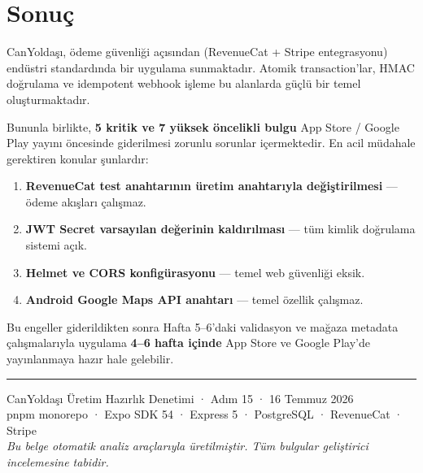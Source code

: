 \documentclass[12pt,a4paper]{article}
\begin{document}
\section{Sonuç}

CanYoldaşı, ödeme güvenliği açısından (RevenueCat + Stripe entegrasyonu) endüstri standardında bir uygulama sunmaktadır. Atomik transaction'lar, HMAC doğrulama ve idempotent webhook işleme bu alanlarda güçlü bir temel oluşturmaktadır.

Bununla birlikte, \textbf{5 kritik ve 7 yüksek öncelikli bulgu} App Store / Google Play yayını öncesinde giderilmesi zorunlu sorunlar içermektedir. En acil müdahale gerektiren konular şunlardır:

\begin{enumerate}
  \item \textbf{RevenueCat test anahtarının üretim anahtarıyla değiştirilmesi} — ödeme akışları çalışmaz.
  \item \textbf{JWT Secret varsayılan değerinin kaldırılması} — tüm kimlik doğrulama sistemi açık.
  \item \textbf{Helmet ve CORS konfigürasyonu} — temel web güvenliği eksik.
  \item \textbf{Android Google Maps API anahtarı} — temel özellik çalışmaz.
\end{enumerate}

Bu engeller giderildikten sonra Hafta 5--6'daki validasyon ve mağaza metadata çalışmalarıyla uygulama \textbf{4--6 hafta içinde} App Store ve Google Play'de yayınlanmaya hazır hale gelebilir.

\vspace{1.5em}
\noindent\rule{\textwidth}{0.4pt}
\begin{center}
  \small\color{gray}
  CanYoldaşı Üretim Hazırlık Denetimi · Adım 15 · 16 Temmuz 2026\\
  pnpm monorepo · Expo SDK 54 · Express 5 · PostgreSQL · RevenueCat · Stripe\\
  \textit{Bu belge otomatik analiz araçlarıyla üretilmiştir. Tüm bulgular geliştirici incelemesine tabidir.}
\end{center}
\end{document}
